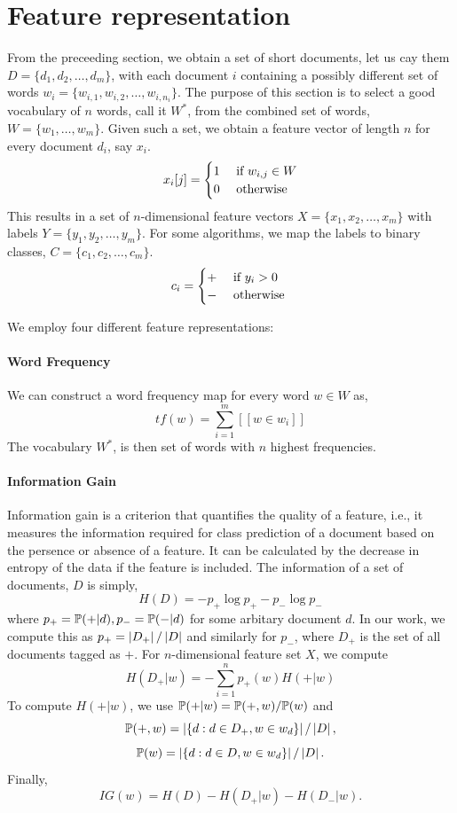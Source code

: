 \documentclass[11pt, letterpaper, conference, final, twocolumn]{ieeeconf}
\begin{document}
\section{Feature representation}
\label{sec:features}

From the preceeding section, we obtain a set of short documents, let us cay them $D = \{d_1, d_2, \ldots, d_m\}$, with each document $i$ containing a possibly different set of words $w_{i} = \{w_{i,1}, w_{i, 2}, \ldots, w_{i, n_i} \}$. The purpose of this section is to select a good vocabulary of $n$ words, call it $W^*$, from the combined set of words, $W = \{w_1, \ldots, w_m\}$. Given such a set, we obtain a feature vector of length $n$ for every document $d_i$, say $x_i$.
$$
x_i[j] = \begin{cases}
	1 & \textrm{ if } w_{i,j} \in W \\
	0 & \textrm{ otherwise }
\end{cases}
$$
This results in a set of $n$-dimensional feature vectors $X = \{ x_1, x_2, \ldots, x_m \}$ with labels $Y = \{y_1, y_2, \ldots, y_m \}$. For some algorithms, we map the labels to binary classes, $C = \{c_1, c_2, \ldots, c_m \}$.
$$
c_i = \begin{cases}
	+ & \textrm{ if } y_i > 0 \\
	- & \textrm{ otherwise }
\end{cases}
$$

We employ four different feature representations:
\paragraph{Word Frequency}
\label{ssec:wf}
We can construct a word frequency map for every word $w \in W$ as,
$$
tf(w) = \sum_{i=1}^m [[ w \in w_i ]]
$$
The vocabulary $W^*$, is then set of words with $n$ highest frequencies.

\paragraph{Information Gain}
\label{ssec:ig}
Information gain is a criterion that quantifies the quality of a feature, i.e., it measures the information required for class prediction of a document based on the persence or absence of a feature. It can be calculated by the decrease in entropy of the data if the feature is included. The information of a set of documents, $D$ is simply,
$$
H(D) = -p_+ \log p_+ - p_- \log p_-
$$
where $p_+ = \mathbb{P}(+ | d), p_- = \mathbb{P}(- | d)$ for some arbitary document $d$. In our work, we compute this as $p_+ = \left| D_+ \right|/\left| D \right|$ and similarly for $p_-$, where $D_+$ is the set of all documents tagged as $+$. For $n$-dimensional feature set $X$, we compute
$$
H(D_+ | w) = -\sum_{i=1}^n p_+(w) H(+ | w)
$$
To compute $H(+|w)$, we use $\mathbb{P}(+ | w) = \mathbb{P}(+, w)/ \mathbb{P}(w)$ and 
$$\mathbb{P}(+, w) = \left| \{ d: d \in D_+, w \in w_d \} \right|/\left| D \right|,$$ 
$$\mathbb{P}(w) = \left| \{ d: d \in D, w \in w_d \} \right|/\left| D \right|.$$
Finally,
$$
IG(w) = H(D) - H(D_+ | w) - H(D_{-} | w).
$$
\end{document}
